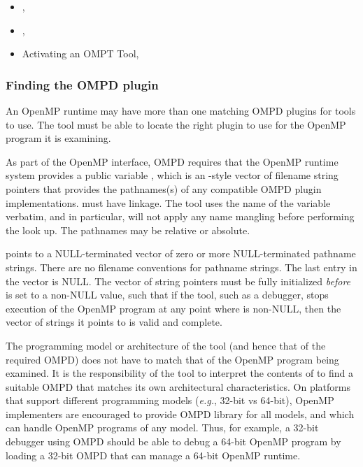 \crossreferences
\begin{itemize}
\item
  , 
\item
  , 
\item
  Activating an OMPT Tool, 
\end{itemize}

\subsubsection{Finding the OMPD plugin}
\label{sec:ompd:finding-the-ompd}

An OpenMP runtime may have more than one matching OMPD plugins for 
tools to use.
The tool must be able to locate the right plugin to use
for the OpenMP program it is examining.

As part of the OpenMP interface, OMPD requires that the OpenMP
runtime system provides a public variable ,
which is an -style vector of filename string pointers that
provides the pathnames(s) of any compatible OMPD plugin implementations.
 must have  linkage.
The tool uses the name of the variable verbatim,
and in particular, will not apply any name mangling before
performing the look up.
The pathnames may be relative or absolute.

 points to a NULL-terminated
vector of zero or more NULL-terminated pathname strings.
There are no filename conventions for pathname strings.
The last entry in the vector is NULL.
The vector of string pointers must be fully initialized \emph{before}
 is set to a non-NULL value,
such that if the tool, such as a debugger,
stops execution of the OpenMP program at any point where
 is non-NULL,
then the vector of strings it points to is valid and complete.

The programming model or architecture of the tool (and hence
that of the required OMPD) does not have to match that of the OpenMP program
being examined.
It is the responsibility of the tool to interpret the contents
of  to find a suitable OMPD that matches
its own architectural characteristics.
On platforms that support different programming models
(\textit{e.g.}, 32-bit vs 64-bit), OpenMP implementers are encouraged
to provide OMPD library for all models, and which can handle
OpenMP programs of any model.
Thus, for example, a 32-bit debugger using OMPD should be able
to debug a 64-bit OpenMP program
by loading a 32-bit OMPD that can manage a 64-bit OpenMP runtime.

